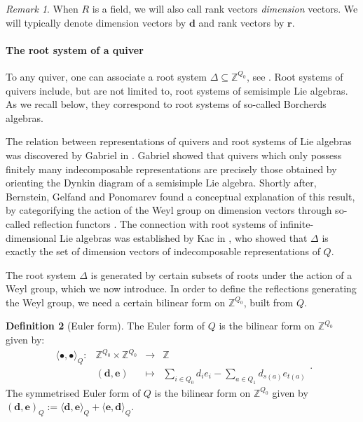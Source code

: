 \documentclass[11pt,english]{article}
\numberwithin{equation}{section}
\numberwithin{figure}{section}
\theoremstyle{definition}
\newtheorem{df}{Definition}[subsection]
\theoremstyle{plain}
\theoremstyle{remark}
\newtheorem{rmk}[df]{Remark}
\newcommand\dd{\mathbf{d}}
\newcommand\ee{\mathbf{e}}
\newcommand\rr{\mathbf{r}}
\newcommand\ZZ{\mathbb{Z}}
\begin{document}
\begin{rmk}

When $R$ is a field, we will also call rank vectors \textit{dimension}
vectors. We will typically denote dimension vectors by $\dd$ and
rank vectors by $\rr$.

\end{rmk}

\paragraph*{The root system of a quiver}

To any quiver, one can associate a root system $\Delta\subseteq\ZZ^{Q_{0}}$,
see \cite{Kac83}. Root systems of quivers include, but are not limited
to, root systems of semisimple Lie algebras. As we recall below, they
correspond to root systems of so-called Borcherds algebras.

The relation between representations of quivers and root systems of
Lie algebras was discovered by Gabriel in \cite{Gab72}. Gabriel showed
that quivers which only possess finitely many indecomposable representations
are precisely those obtained by orienting the Dynkin diagram of a
semisimple Lie algebra. Shortly after, Bernstein, Gelfand and Ponomarev
found a conceptual explanation of this result, by categorifying the
action of the Weyl group on dimension vectors through so-called reflection
functors \cite{BGP73}. The connection with root systems of infinite-dimensional
Lie algebras was established by Kac in \cite{Kac80}, who showed that
$\Delta$ is exactly the set of dimension vectors of indecomposable
representations of $Q$.

The root system $\Delta$ is generated by certain subsets of roots
under the action of a Weyl group, which we now introduce. In order
to define the reflections generating the Weyl group, we need a certain
bilinear form on $\ZZ^{Q_{0}}$, built from $Q$.

\begin{df}[Euler form]

The Euler form of $Q$ is the bilinear form on $\ZZ^{Q_{0}}$ given
by:\[
\begin{array}{cccc}
\langle\bullet,\bullet\rangle_Q: & \ZZ^{Q_0}\times\ZZ^{Q_0} & \rightarrow & \ZZ \\
& (\dd,\ee) & \mapsto & \sum_{i\in Q_0}d_ie_i-\sum_{a\in Q_1}d_{s(a)}e_{t(a)}
\end{array}
.
\] The symmetrised Euler form of $Q$ is the bilinear form on $\ZZ^{Q_{0}}$
given by $(\dd,\ee)_{Q}:=\langle\dd,\ee\rangle_{Q}+\langle\ee,\dd\rangle_{Q}$.

\end{df}
\end{document}
